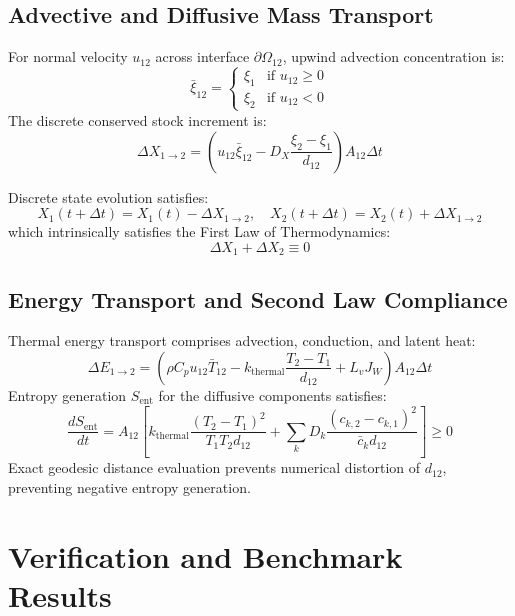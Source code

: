\documentclass[11pt,a4paper]{article}
\theoremstyle{definition}
\begin{document}
\subsection{Advective and Diffusive Mass Transport}
For normal velocity $u_{12}$ across interface $\partial \Omega_{12}$, upwind advection concentration is:
\begin{equation}
\bar{\xi}_{12} = \begin{cases} \xi_1 & \text{if } u_{12} \ge 0 \\ \xi_2 & \text{if } u_{12} < 0 \end{cases}
\end{equation}
The discrete conserved stock increment is:
\begin{equation}
\Delta X_{1 \to 2} = \left( u_{12} \bar{\xi}_{12} - D_X \frac{\xi_2 - \xi_1}{d_{12}} \right) A_{12} \Delta t
\end{equation}

Discrete state evolution satisfies:
\begin{equation}
X_1(t + \Delta t) = X_1(t) - \Delta X_{1 \to 2}, \quad X_2(t + \Delta t) = X_2(t) + \Delta X_{1 \to 2}
\end{equation}
which intrinsically satisfies the First Law of Thermodynamics:
\begin{equation}
\Delta X_1 + \Delta X_2 \equiv 0
\end{equation}

\subsection{Energy Transport and Second Law Compliance}
Thermal energy transport comprises advection, conduction, and latent heat:
\begin{equation}
\Delta E_{1 \to 2} = \left( \rho C_p u_{12} \bar{T}_{12} - k_{\text{thermal}} \frac{T_2 - T_1}{d_{12}} + L_v J_{W} \right) A_{12} \Delta t
\end{equation}
Entropy generation $S_{\text{ent}}$ for the diffusive components satisfies:
\begin{equation}
\frac{dS_{\text{ent}}}{dt} = A_{12} \left[ k_{\text{thermal}} \frac{(T_2 - T_1)^2}{T_1 T_2 d_{12}} + \sum_k D_k \frac{(c_{k, 2} - c_{k, 1})^2}{\bar{c}_k d_{12}} \right] \ge 0
\end{equation}
Exact geodesic distance evaluation prevents numerical distortion of $d_{12}$, preventing negative entropy generation.

\section{Verification and Benchmark Results}
\end{document}
